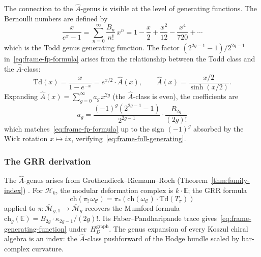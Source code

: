 The connection to the $\hat{A}$-genus is visible at the level of
generating functions. The Bernoulli numbers are defined by
\begin{equation}\label{eq:frame-bernoulli-gf}
\frac{x}{e^x - 1} = \sum_{n=0}^{\infty} \frac{B_n}{n!}\, x^n
= 1 - \frac{x}{2} + \frac{x^2}{12} - \frac{x^4}{720} + \cdots
\end{equation}
which is the Todd genus generating function. The factor
$(2^{2g-1}-1)/2^{2g-1}$ in~\eqref{eq:frame-fp-formula} arises
from the relationship between the Todd class and the $\hat{A}$-class:
\begin{equation}\label{eq:frame-todd-ahat}
\mathrm{Td}(x) = \frac{x}{1 - e^{-x}} = e^{x/2} \cdot \hat{A}(x),
\qquad
\hat{A}(x) = \frac{x/2}{\sinh(x/2)}.
\end{equation}
Expanding $\hat{A}(x) = \sum_{g=0}^{\infty} a_g\, x^{2g}$
(the $\hat{A}$-class is even), the coefficients are
\begin{equation}\label{eq:frame-ahat-bernoulli}
a_g = \frac{(-1)^g(2^{2g-1}-1)}{2^{2g-1}} \cdot \frac{B_{2g}}{(2g)!}
\end{equation}
which matches~\eqref{eq:frame-fp-formula} up to the sign
$(-1)^g$ absorbed by the Wick rotation $x \mapsto ix$,
verifying~\eqref{eq:frame-full-generating}.

\subsubsection*{The GRR derivation}

\begin{remark}
\label{rem:frame-family-index}
The $\hat{A}$-genus arises from Grothendieck--Riemann--Roch \ifannalsedition\else
(Theorem~\ref{thm:family-index})
\fi. For $\mathcal{H}_k$, the modular deformation complex is $k \cdot \mathbb{E}$; the GRR formula
\begin{equation}\label{eq:frame-grr}
\mathrm{ch}(\pi_!\, \omega_{\mathcal{C}})
= \pi_*\!\left(\mathrm{ch}(\omega_{\mathcal{C}}) \cdot
\mathrm{Td}(T_\pi)\right)
\end{equation}
applied to $\pi\colon \overline{\mathcal{M}}_{g,1} \to \overline{\mathcal{M}}_g$ recovers the Mumford formula $\mathrm{ch}_g(\mathbb{E}) = B_{2g} \cdot \kappa_{2g-1}/(2g)!$.  Its Faber--Pandharipande trace gives~\eqref{eq:frame-generating-function} under~$H_D^{\mathrm{graph}}$. The genus expansion of every Koszul chiral algebra is an index: the $\hat{A}$-class pushforward of the Hodge bundle scaled by bar-complex curvature.
\end{remark}

